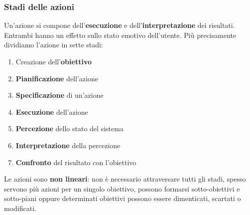 \subsubsection{Stadi delle azioni}
Un'azione si compone dell'\textbf{esecuzione} e dell'\textbf{interpretazione} dei risultati. Entrambi hanno un effetto sullo stato emotivo dell'utente. Più precisamente dividiamo l'azione in sette stadi:
\begin{enumerate}
	\item Creazione dell'\textbf{obiettivo}
	\item \textbf{Pianificazione} dell'azione
	\item \textbf{Specificazione} di un'azione
	\item \textbf{Esecuzione} dell'azione
	\item \textbf{Percezione} dello stato del sistema
	\item \textbf{Interpretazione} della percezione
	\item \textbf{Confronto} del risultato con l'obiettivo
\end{enumerate}
Le azioni sono \textbf{non lineari}: non è necessario attraversare tutti gli stadi, spesso servono più azioni per un singolo obiettivo, possono formarsi sotto-obiettivi e sotto-piani oppure determinati obiettivi possono essere dimenticati, scartati o modificati.\\

